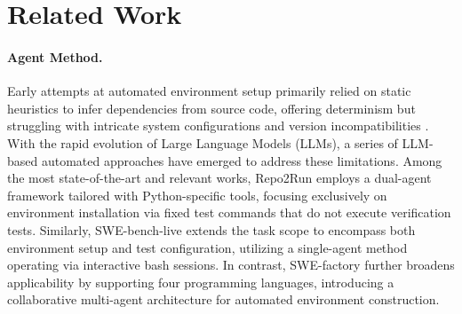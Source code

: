 \documentclass{article}
\theoremstyle{plain}
\theoremstyle{definition}
\theoremstyle{remark}
\begin{document}
\section{Related Work}
\paragraph{Agent Method.}
Early attempts at automated environment setup primarily relied on static heuristics to infer dependencies from source code, offering determinism but struggling with intricate system configurations and version incompatibilities \citep{gruber_flapy_2023,zhang_codeagent_2024,badertdinov2024scaling}. 
With the rapid evolution of Large Language Models (LLMs), a series of LLM-based automated approaches have emerged to address these limitations\citep{bouzenia_you_2025,milliken_beyond_2025,vergopoulos_automated_2025,badertdinov_swe-rebench_2025}.
Among the most state-of-the-art and relevant works, Repo2Run\cite{hu_repo2run_2025} employs a dual-agent framework tailored with Python-specific tools, focusing exclusively on environment installation via fixed test commands that do not execute verification tests. Similarly, SWE-bench-live\cite{zhang_swe-bench_2025} extends the task scope to encompass both environment setup and test configuration, utilizing a single-agent method operating via interactive bash sessions. In contrast, SWE-factory\cite{guo_swe-factory_2025} further broadens applicability by supporting four programming languages, introducing a collaborative multi-agent architecture for automated environment construction.
\end{document}
